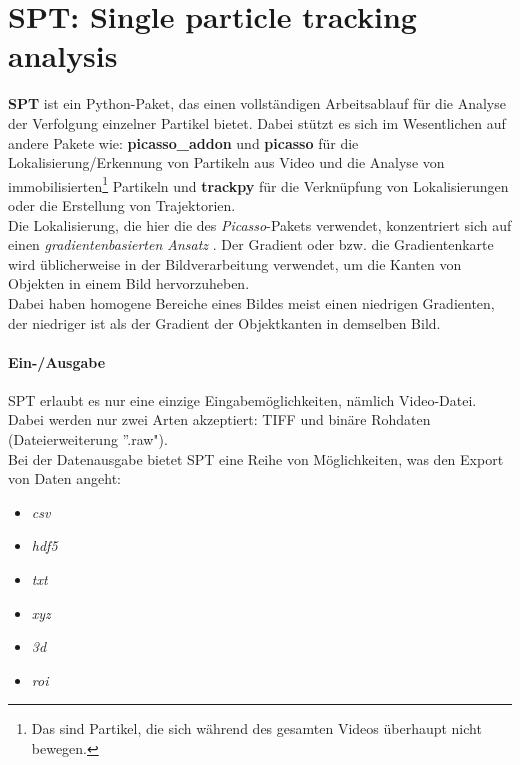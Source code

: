 \section{SPT: Single particle tracking analysis \label{kap1_STP}}
\textbf{SPT} \cite{spt_stehr_stein_2020} ist ein Python-Paket, das einen vollständigen Arbeitsablauf für die Analyse der Verfolgung einzelner Partikel bietet. Dabei stützt es sich im Wesentlichen auf andere Pakete wie: \textbf{picasso\_addon} \cite{picasso_addon_schwille-paint_2020} und \textbf{picasso} \cite{picasso_jungmannlab_2019} für die Lokalisierung/Erkennung von Partikeln aus Video und die Analyse von immobilisierten\footnote{Das sind Partikel, die sich während des gesamten Videos überhaupt nicht bewegen.} Partikeln und \textbf{trackpy} \cite{trackpy_allan_daniel_b_2021_4682814} für die Verknüpfung von Lokalisierungen oder die Erstellung von Trajektorien.\\
Die Lokalisierung, die hier die des \textit{Picasso}-Pakets verwendet, konzentriert sich auf einen \textit{gradientenbasierten Ansatz} \cite{soboleva2021raindrops}. Der Gradient oder bzw. die Gradientenkarte wird üblicherweise in der Bildverarbeitung verwendet, um die Kanten von Objekten in einem Bild hervorzuheben.\\ Dabei haben homogene Bereiche eines Bildes meist einen niedrigen Gradienten, der niedriger ist als der Gradient der Objektkanten in demselben Bild. 

\paragraph{Ein-/Ausgabe \\} 
    SPT erlaubt es nur eine einzige Eingabemöglichkeiten,  nämlich Video-Datei. Dabei werden nur zwei Arten akzeptiert: TIFF und binäre Rohdaten (Dateierweiterung ''.raw").\\
    Bei der Datenausgabe bietet SPT eine Reihe von Möglichkeiten, was den Export von Daten angeht: 
    \begin{itemize}
    \item \textit{csv}
    \item \textit{hdf5}
    \item \textit{txt}
    \item \textit{xyz}
    \item \textit{3d}
    \item \textit{roi}
    \end{itemize}
    
    
